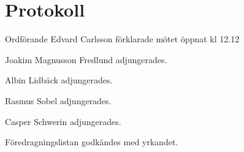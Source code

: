 \documentclass[10pt]{article}
\def\mo{Edvard Carlsson}
\begin{document}
\section*{Protokoll}
\begin{paragrafer}
Ordförande {\mo} förklarade mötet öppnat kl 12.12

{\valavmo}

{\valavms}

{\valavj}

{\tosg}

Joakim Magnusson Fredlund adjungerades. 

Albin Lidbäck adjungerades.

Rasmus Sobel adjungerades.

Casper Schwerin adjungerades.




Föredragningslistan godkändes med yrkandet.


\begin{fyllnadsval} %


\end{fyllnadsval}


\end{paragrafer}
\end{document}
